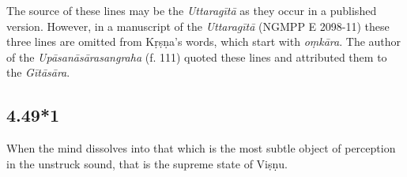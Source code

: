 \begin{ekdosis}
\begin{philcomm}[hp04_049]
The source of these lines may be the \emph{Uttaragītā} as they occur in a published version. However, in a manuscript of the \emph{Uttaragītā} (NGMPP E 2098-11) these three lines are omitted from Kṛṣṇa's words, which start with \emph{oṃkāra}. The author of the \emph{Upāsanāsārasangraha} (f. 111) quoted these lines and attributed them to the \emph{Gītāsāra}. 


\end{philcomm}


\subsection*{4.49*1}
\begin{translation}[hp04_049]
When the mind dissolves into that which is the most subtle object of perception in the unstruck sound, that is the supreme state of Viṣṇu.
\end{translation}


\end{ekdosis}
